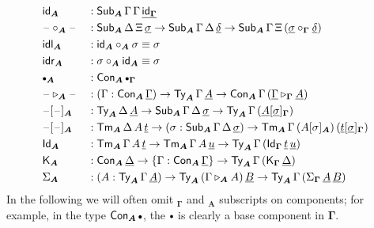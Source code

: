 \documentclass[12pt,a4paper,twoside,openany]{book}
\theoremstyle{remark}
\theoremstyle{definition}
\theoremstyle{theorem}
\newcommand{\ms}[1]{\mathsf{#1}}
\newcommand{\bs}[1]{\boldsymbol{#1}}
\newcommand{\id}{\mathsf{id}}
\newcommand{\Con}{\mathsf{Con}}
\newcommand{\Sub}{\mathsf{Sub}}
\newcommand{\Tm}{\mathsf{Tm}}
\newcommand{\Ty}{\mathsf{Ty}}
\newcommand{\Id}{\mathsf{Id}}
\newcommand{\blank}{\mathord{\hspace{1pt}\text{--}\hspace{1pt}}}
\newcommand{\ra}{\rightarrow}
\newcommand{\ext}{\triangleright}
\newcommand{\emptycon}{\scaleobj{.75}\bullet}
\newcommand{\K}{\mathsf{K}}
\newcommand{\bGamma}{\bs{\Gamma}}
\newcommand{\bA}{\bs{A}}
\newcommand{\ul}[1]{\underline{#1}}
\newcommand{\ulGamma}{\ul{\Gamma}}
\newcommand{\ulDelta}{\ul{\Delta}}
\newcommand{\uldelta}{\ul{\delta}}
\newcommand{\ulsigma}{\ul{\sigma}}
\newcommand{\ult}{\ul{t}}
\newcommand{\ulu}{\ul{u}}
\newcommand{\ulA}{\ul{A}}
\newcommand{\ulB}{\ul{B}}
\begin{document}
\begin{alignat*}{3}
  & \id_{\bA} &&: \Sub_{\bA}\,\Gamma\,\Gamma\,\ul{\id_{\bGamma}}\\
  & \blank\circ_{\bA}\blank &&: \Sub_{\bA}\,\Delta\,\Xi\,\ulsigma \to \Sub_{\bA}\,\Gamma\,\Delta\,\uldelta
    \to \Sub_{\bA}\,\Gamma\,\Xi\,(\ulsigma \circ_{\bGamma} \uldelta)\\
  & \ms{idl}_{\bA} &&:  \id_{\bA} \circ_{\bA} \sigma \equiv \sigma \\
  & \ms{idr}_{\bA} &&:  \sigma \circ_{\bA} \id_{\bA} \equiv \sigma \\
  & \emptycon_{\bA} && : \Con_{\bA}\,\emptycon_{\bGamma}\\
  & \blank\ext_{\bA}\blank && : (\Gamma : \Con_{\bA}\,\ulGamma)\ra \Ty_{\bA}\,\Gamma\,\ulA \ra
                     \Con_{\bA}\,\Gamma\,(\ulGamma \ext_{\bGamma} \ulA)\\
  & \blank[\blank]_{\bA} && : \Ty_{\bA}\,\Delta\,\ulA \ra \Sub_{\bA}\,\Gamma\,\Delta\,\ulsigma
                     \ra \Ty_{\bA}\,\Gamma\, (\ulA[\ulsigma]_{\bGamma})\\
  & \blank[\blank]_{\bA} && : \Tm_{\bA}\,\Delta\,A\,\ult \ra (\sigma : \Sub_{\bA}\,\Gamma\,\Delta\,\ulsigma)
                        \ra \Tm_{\bA}\,\Gamma\, (A[\sigma]_{\bA})\,(\ult[\ulsigma]_{\bGamma})\\
  &\Id_{\bA} &&: \Tm_{\bA}\,\Gamma\,A\,\ult \to \Tm_{\bA}\,\Gamma\,A\,\ulu \to \Ty_{\bA}\,\Gamma\,(\Id_{\bGamma}\,\ult\,\ulu)\\
  &\K_{\bA} &&: \Con_{\bA}\,\ulDelta \to \{\Gamma : \Con_{\bA}\,\ulGamma\} \to \Ty_{\bA}\,\Gamma\,(\K_{\bGamma}\,\ulDelta)\\
  &\Sigma_{\bA} &&: (A : \Ty_{\bA}\,\Gamma\,\ulA) \to \Ty_{\bA}\,(\Gamma \ext_{\bA} A)\,\ulB \to
                   \Ty_{\bA}\,\Gamma\,(\Sigma_{\bGamma}\,\ulA\,\ulB)
\end{alignat*}
\endgroup
In the following we will often omit $_{\bGamma}$ and $_{\bA}$ subscripts on
components; for example, in the type $\Con_{\bA}\,\emptycon$, the $\emptycon$ is
clearly a base component in $\bGamma$.
\end{document}
